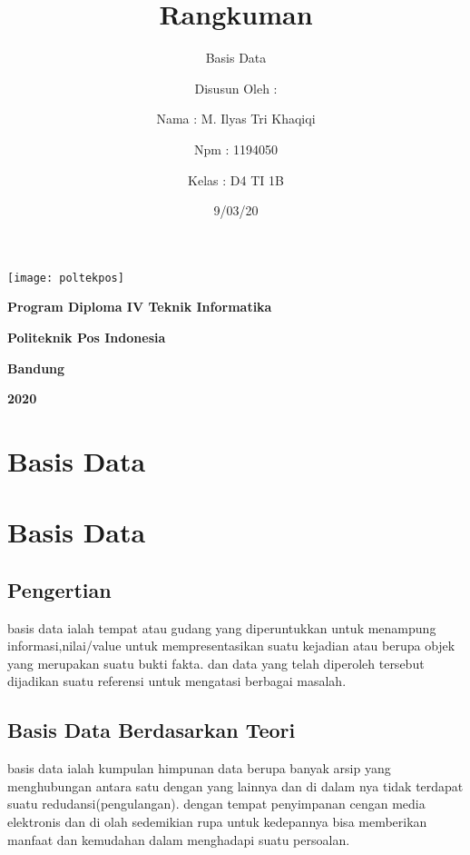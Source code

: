 \documentclass[a4paper,12 pt]{article}
\title{{Rangkuman}}
\author{Basis Data}
\date{9/03/20}
\begin{document}
\maketitle

\begin{center}
\texttt{[image: poltekpos]}
\end{center}

\begin{center}
\author{Disusun Oleh :}
\end{center}
\begin{center}
\author{Nama : M. Ilyas Tri Khaqiqi}
\end{center}
\begin{center}
\author{Npm : 1194050}
\end{center}
\begin{center}
\author{Kelas : D4 TI 1B}
\end{center}
\vspace{1cm}
\begin{center}
\textbf{Program Diploma IV Teknik Informatika}
\end{center}
\begin{center}
\textbf{Politeknik Pos Indonesia}
\end{center}
\begin{center}
\textbf{Bandung}
\end{center}
\begin{center}
\textbf{2020}
\end{center}




\newpage
\section{Basis Data}
\section{Basis Data}
\subsection{Pengertian}
	basis data ialah tempat atau gudang yang diperuntukkan untuk menampung informasi,nilai/value untuk mempresentasikan suatu kejadian atau berupa objek yang merupakan suatu bukti fakta. dan data yang telah diperoleh tersebut dijadikan suatu referensi untuk mengatasi berbagai masalah.
	
\subsection{Basis Data Berdasarkan Teori}
basis data ialah kumpulan himpunan data berupa banyak arsip yang menghubungan antara satu dengan yang lainnya dan di dalam nya tidak terdapat suatu redudansi(pengulangan). dengan tempat penyimpanan cengan media elektronis dan di olah sedemikian rupa untuk kedepannya bisa memberikan manfaat dan kemudahan dalam menghadapi suatu persoalan.
	
\end{document}
